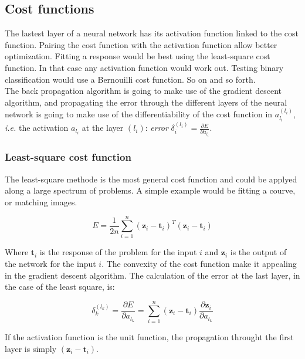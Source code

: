 \documentclass[final, paper=letter,5p,times,twocolumn]{elsarticle}
\begin{document}
\subsection{Cost functions}
\label{sec:cost_functions}

The lastest layer of a neural network has its activation function linked to the cost function. Pairing the cost function with the activation function allow better optimization. Fitting a response would be best using the least-square cost function. In that case any activation function would work out. Testing binary classification would use a Bernouilli cost function. So on and so forth.\\
The back propagation algorithm is going to make use of the gradient descent algorithm, and propagating the error through the different layers of the neural network is going to make use of the differentiability of the cost function in $a_{l_{i}}^{(l_{i})}$, {\it i.e.} the activation $a_{l_{i}}$ at the layer $(l_{i})$: {\it error} $\delta_{i}^{(l_{i})} = \frac{\partial E}{\partial a_{l_{i}}}$.

\subsubsection{Least-square cost function}

The least-square methode is the most general cost function and could be applyed along a large spectrum of problems. A simple example would be fitting a courve, or matching images. 

\begin{equation}
  E = \frac{1}{2n} \sum_{i = 1}^{n} (\bm{z}_{i} - \bm{t}_{i})^{T}(\bm{z}_{i} - \bm{t}_{i})
  \label{eq:least_squarre}
\end{equation}

Where $\bm{t}_{i}$ is the response of the problem for the input $i$ and $\bm{z}_{i}$ is the output of the network for the input $i$. The convexity of the cost function make it appealing in the gradient descent algorithm. The calculation of the error at the last layer, in the case of the least square, is:

\begin{equation}
  \delta_{k}^{(l_{k})} = \frac{\partial E}{\partial a_{l_{k}}} = \sum_{i = 1}^{n} (\bm{z}_{i} - \bm{t}_{i})\frac{\partial \bm{z}_{i}}{\partial a_{l_{k}}}
  \label{eq:least_squarre_error}
\end{equation}
 
If the activation function is the unit function, the propagation throught the first layer is simply $(\bm{z}_{i} - \bm{t}_{i})$.
\end{document}
